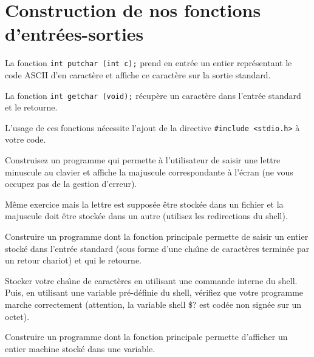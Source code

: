 \documentclass[12pts]{article}
\begin{document}
\section{Construction de nos fonctions d'entr\'ees-sorties}
\begin{exercice}
  La fonction \verb?int putchar (int c);? prend en entr\'ee un entier
  repr\'esentant le code ASCII d'en caract\`ere et affiche ce
  caract\`ere sur la sortie standard.
  \par
  La fonction \verb?int getchar (void);? r\'ecup\`ere un caract\`ere
  dans l'entr\'ee standard et le retourne.
  \par
  L'usage de ces fonctions n\'ecessite l'ajout de la directive
  \verb?#include <stdio.h>? \`a votre code.
  \par
  Construisez un programme qui permette \`a l'utilisateur de saisir
  une lettre minuscule au clavier et affiche la majuscule
  correspondante \`a l'\'ecran (ne vous occupez pas de la gestion
  d'erreur).
  \par
  M\^eme exercice mais la lettre est suppos\'ee \^etre stock\'ee dans
  un fichier et la majuscule doit \^etre stock\'ee dans un autre
  (utilisez les redirections du shell).
\end{exercice}

\begin{exercice} 
\label{exercicecounter:getchar}
Construire un programme dont la fonction principale permette de saisir
un entier stock\'e dans l'entr\'ee standard (sous forme d'une
cha\^\i{}ne de caract\`eres termin\'ee par un retour chariot) et qui
le retourne.
\ifcorrection%
\begin{correction}

\end{correction}
\fi%
Stocker votre cha\^\i{}ne de caract\`eres en utilisant une commande
interne du shell.  Puis, en utilisant une variable pr\'e-d\'efinie du
shell, v\'erifiez que votre programme marche correctement (attention,
la variable shell \$? est cod\'ee non sign\'ee sur un octet).
\end{exercice}

\begin{exercice} 
  Construire un programme dont la fonction principale permette
  d'afficher un entier machine stock\'e dans une variable.
  \ifcorrection
  \begin{correction}
    
  \end{correction}
  \fi 
\end{exercice}
\end{document}
